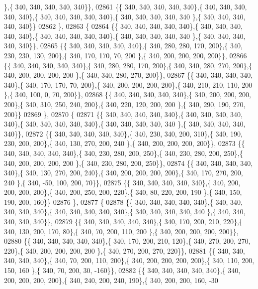 \begin{DoxyCode}
      \},\{ 340, 340, 340, 340, 340\}\},
02861 \{\{ 340, 340, 340, 340, 340\},\{ 340, 340, 340, 340, 340\},\{ 340, 340, 340, 340, 340\},\{ 340, 340, 340, 340, 340
      \},\{ 340, 340, 340, 340, 340\}\}
02862 \},
02863 \{
02864 \{\{ 340, 340, 340, 340, 340\},\{ 340, 340, 340, 340, 340\},\{ 340, 340, 340, 340, 340\},\{ 340, 340, 340, 340, 340
      \},\{ 340, 340, 340, 340, 340\}\},
02865 \{\{ 340, 340, 340, 340, 340\},\{ 340, 280, 280, 170, 200\},\{ 340, 230, 230, 130, 200\},\{ 340, 170, 170,  70, 200
      \},\{ 340, 200, 200, 200, 200\}\},
02866 \{\{ 340, 340, 340, 340, 340\},\{ 340, 280, 280, 170, 200\},\{ 340, 340, 280, 270, 200\},\{ 340, 200, 200, 200, 200
      \},\{ 340, 340, 280, 270, 200\}\},
02867 \{\{ 340, 340, 340, 340, 340\},\{ 340, 170, 170,  70, 200\},\{ 340, 200, 200, 200, 200\},\{ 340, 210, 210, 110, 200
      \},\{ 340, 100,   0,  70, 200\}\},
02868 \{\{ 340, 340, 340, 340, 340\},\{ 340, 200, 200, 200, 200\},\{ 340, 310, 250, 240, 200\},\{ 340, 220, 120, 200, 200
      \},\{ 340, 290, 190, 270, 200\}\}
02869 \},
02870 \{
02871 \{\{ 340, 340, 340, 340, 340\},\{ 340, 340, 340, 340, 340\},\{ 340, 340, 340, 340, 340\},\{ 340, 340, 340, 340, 340
      \},\{ 340, 340, 340, 340, 340\}\},
02872 \{\{ 340, 340, 340, 340, 340\},\{ 340, 230, 340, 200, 310\},\{ 340, 190, 230, 200, 200\},\{ 340, 130, 270, 200, 240
      \},\{ 340, 200, 200, 200, 200\}\},
02873 \{\{ 340, 340, 340, 340, 340\},\{ 340, 230, 280, 200, 250\},\{ 340, 230, 280, 200, 250\},\{ 340, 200, 200, 200, 200
      \},\{ 340, 230, 280, 200, 250\}\},
02874 \{\{ 340, 340, 340, 340, 340\},\{ 340, 130, 270, 200, 240\},\{ 340, 200, 200, 200, 200\},\{ 340, 170, 270, 200, 240
      \},\{ 340, -50, 100, 200,  70\}\},
02875 \{\{ 340, 340, 340, 340, 340\},\{ 340, 200, 200, 200, 200\},\{ 340, 200, 250, 200, 220\},\{ 340,  80, 220, 200, 190
      \},\{ 340, 150, 190, 200, 160\}\}
02876 \},
02877 \{
02878 \{\{ 340, 340, 340, 340, 340\},\{ 340, 340, 340, 340, 340\},\{ 340, 340, 340, 340, 340\},\{ 340, 340, 340, 340, 340
      \},\{ 340, 340, 340, 340, 340\}\},
02879 \{\{ 340, 340, 340, 340, 340\},\{ 340, 170, 200, 210, 220\},\{ 340, 130, 200, 170,  80\},\{ 340,  70, 200, 110, 200
      \},\{ 340, 200, 200, 200, 200\}\},
02880 \{\{ 340, 340, 340, 340, 340\},\{ 340, 170, 200, 210, 120\},\{ 340, 270, 200, 270, 220\},\{ 340, 200, 200, 200, 200
      \},\{ 340, 270, 200, 270, 220\}\},
02881 \{\{ 340, 340, 340, 340, 340\},\{ 340,  70, 200, 110, 200\},\{ 340, 200, 200, 200, 200\},\{ 340, 110, 200, 150, 160
      \},\{ 340,  70, 200,  30, -160\}\},
02882 \{\{ 340, 340, 340, 340, 340\},\{ 340, 200, 200, 200, 200\},\{ 340, 240, 200, 240, 190\},\{ 340, 200, 200, 160, -30

\end{DoxyCode}
